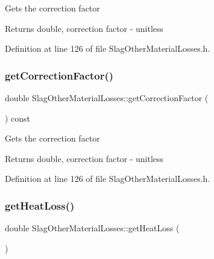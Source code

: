 Gets the correction factor

\begin{DoxyReturn}{Returns}
double, correction factor -\/ unitless 
\end{DoxyReturn}


Definition at line 126 of file Slag\+Other\+Material\+Losses.\+h.

\mbox{\label{class_slag_other_material_losses_a920bbc2da2ba90416e86573830eee2cb}} 
\subsubsection{\texorpdfstring{get\+Correction\+Factor()}{getCorrectionFactor()}\hspace{0.1cm}{\footnotesize\ttfamily [3/3]}}
{\footnotesize\ttfamily double Slag\+Other\+Material\+Losses\+::get\+Correction\+Factor (\begin{DoxyParamCaption}{ }\end{DoxyParamCaption}) const\hspace{0.3cm}{\ttfamily [inline]}}

Gets the correction factor

\begin{DoxyReturn}{Returns}
double, correction factor -\/ unitless 
\end{DoxyReturn}


Definition at line 126 of file Slag\+Other\+Material\+Losses.\+h.

\mbox{\label{class_slag_other_material_losses_a4c96a826ef6da38f4c27f7efd8b4a7ba}} 
\subsubsection{\texorpdfstring{get\+Heat\+Loss()}{getHeatLoss()}\hspace{0.1cm}{\footnotesize\ttfamily [1/3]}}
{\footnotesize\ttfamily double Slag\+Other\+Material\+Losses\+::get\+Heat\+Loss (\begin{DoxyParamCaption}{ }\end{DoxyParamCaption})}

